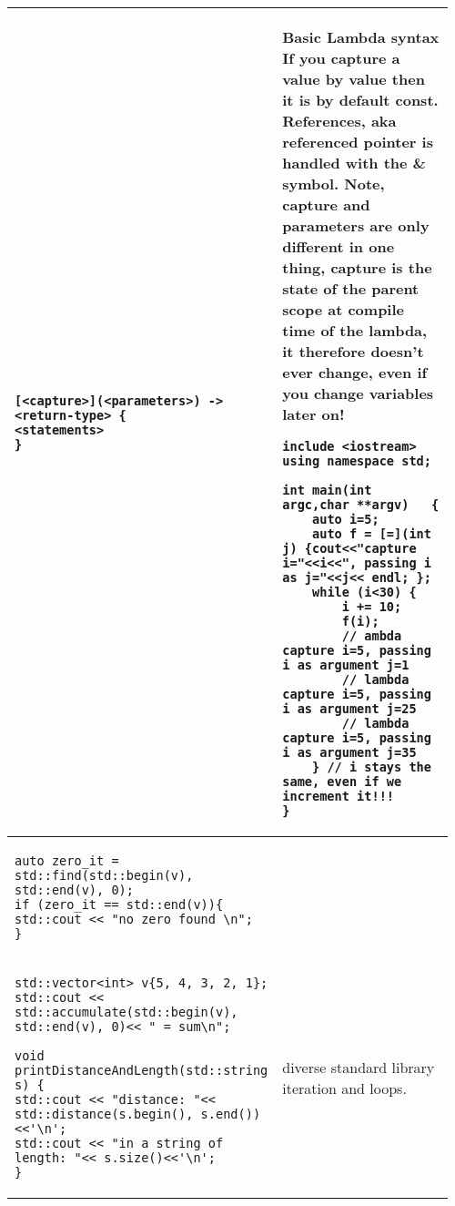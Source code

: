 \documentclass[main.tex,fontsize=8pt,paper=a4,paper=portrait,DIV=calc]{scrartcl}
\begin{document}
\begin{table}[h!]
\begin{tabular}{|m{0.4\linewidth}|m{0.555\linewidth}|}
\hline
\begin{lstlisting}
[<capture>](<parameters>) -> <return-type> {
<statements>
}
\end{lstlisting}
& Basic Lambda syntax\newline
If you capture a value by value then it is by default const.\newline
 References, aka referenced pointer is handled with the \& symbol.\newline
 Note, capture and parameters are only different in one thing, capture is the state of the parent scope at compile time of the lambda, it therefore doesn't ever change, even if you change variables later on!\newline
\begin{lstlisting}
include <iostream>
using namespace std;

int main(int argc,char **argv)   {
    auto i=5;
    auto f = [=](int j) {cout<<"capture i="<<i<<", passing i as j="<<j<< endl; };
    while (i<30) {
        i += 10;
        f(i);
        // ambda capture i=5, passing i as argument j=1      
        // lambda capture i=5, passing i as argument j=25
        // lambda capture i=5, passing i as argument j=35
    } // i stays the same, even if we increment it!!!
}
\end{lstlisting}
\\
\hline
\begin{lstlisting}
auto zero_it = std::find(std::begin(v), std::end(v), 0);
if (zero_it == std::end(v)){
std::cout << "no zero found \n";
}
\end{lstlisting}
&

\\

\hline
\begin{lstlisting}
std::vector<int> v{5, 4, 3, 2, 1};
std::cout << std::accumulate(std::begin(v), std::end(v), 0)<< " = sum\n";

void printDistanceAndLength(std::string s) {
std::cout << "distance: "<< std::distance(s.begin(), s.end()) <<'\n';
std::cout << "in a string of length: "<< s.size()<<'\n';
}
\end{lstlisting}
& diverse standard library iteration and loops.
\\


\end{tabular}
\end{table}
\end{document}
